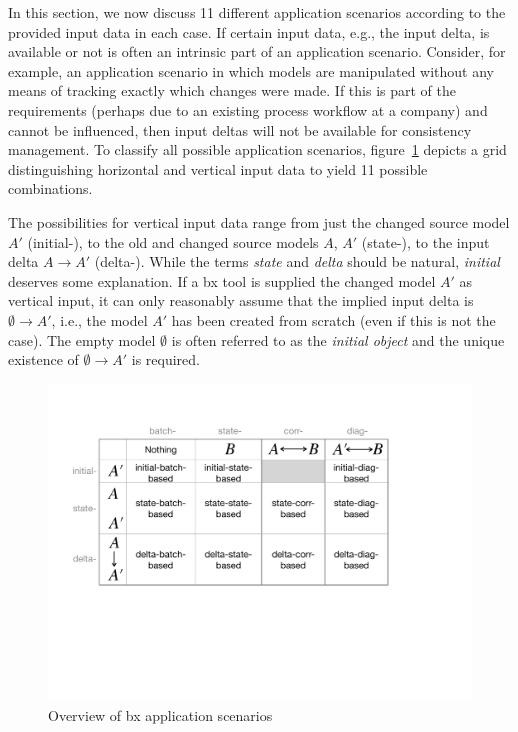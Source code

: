 In this section, we now discuss 11 different application scenarios according to the provided input data in each case.
If certain input data, e.g., the input delta, is available or not is often an intrinsic part of an application scenario.
Consider, for example, an application scenario in which models are manipulated without any means of tracking exactly which changes were made.
If this is part of the requirements (perhaps due to an existing process workflow at a company) and cannot be influenced, then input deltas will not be available for consistency management.
%
To classify all possible application scenarios, figure~\ref{fig:architectureLandscape} depicts a grid distinguishing horizontal and vertical input data to yield 11 possible combinations.

The possibilities for vertical input data range from just the changed source model $A'$ (initial-), to the old and changed source models $A$, $A'$ (state-), to the input delta $A \rightarrow A'$ (delta-).
While the terms \emph{state} and \emph{delta} should be natural, \emph{initial} deserves some explanation.
If a bx tool is supplied the changed model $A'$ as vertical input, it can only reasonably assume that the implied input delta is $\emptyset \rightarrow A'$, i.e., the model $A'$ has been created from scratch (even if this is not the case).
The empty model $\emptyset$ is often referred to as the \emph{initial object} and the unique existence of $\emptyset \rightarrow A'$ is required.

\begin{figure}[tb!]
	\centering
	\includegraphics[width=0.9\columnwidth]{diagrams/foundations//ArchitectureLandscape}
	\caption{Overview of bx application scenarios}
	\label{fig:architectureLandscape}
\end{figure}

